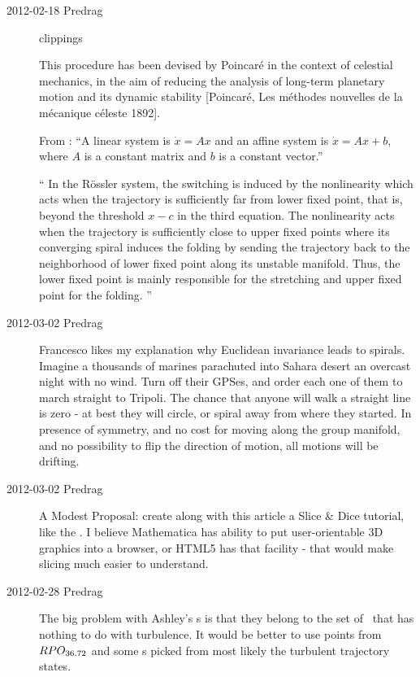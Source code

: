 \begin{description}
\item[2012-02-18 Predrag] clippings

This procedure has been devised by Poincar\'e in the context of celestial
mechanics, in the aim of reducing the analysis of long-term planetary
motion and its dynamic stability [Poincar\'e, Les m\'ethodes nouvelles de
la m\'ecanique c\'eleste 1892].

From :
``A linear system is $\dot{x} =Ax$ and an affine system is $\dot{x}
=Ax+b$, where $A$ is a constant matrix and $b$ is a constant vector.''
                                            \toCB

``
In the R\"ossler system, the switching is induced by the nonlinearity
which acts when the trajectory is sufficiently far from lower fixed
point, that is, beyond the threshold $x-c$ in the third equation. The
nonlinearity acts when the trajectory is sufficiently close to upper
fixed points where its converging spiral induces the folding by sending
the trajectory back to the neighborhood of lower fixed point along its
unstable manifold. Thus, the lower fixed point is mainly responsible for
the stretching and upper fixed point for the folding.
''

\item[2012-03-02 Predrag] Francesco likes my explanation why Euclidean
invariance leads to spirals. Imagine a thousands of marines parachuted
into Sahara desert an overcast night with no wind. Turn off their GPSes,
and order each one of them to march straight to Tripoli. The chance that
anyone will walk a straight line is zero - at best they will circle, or
spiral away from where they started. In presence of symmetry, and no cost
for moving along the group manifold, and no possibility to flip the
direction of motion, all motions will be drifting.

\item[2012-03-02 Predrag]
A Modest Proposal: create along with this article a Slice \& Dice
tutorial, like the . I believe Mathematica has ability to put user-orientable 3D
graphics into a browser, or HTML5 has that facility - that would make
slicing much easier to understand.

\item[2012-02-28 Predrag]
    The big problem with Ashley's %
    \template s
    is that they belong to the set of \reqva\ that has nothing to do with
    turbulence. It would be better to use points from $RPO_{36.72}$ and
    some \template s picked from most likely the turbulent trajectory
    states.


\end{description}
